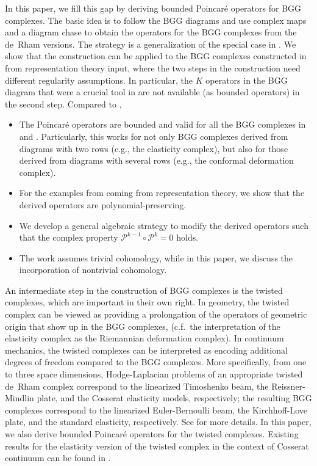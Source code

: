 \documentclass[11pt]{amsart}
\newcommand{\0}{\mathaccent23}
\begin{document}
In this paper, we fill this gap by deriving bounded Poincar\'e operators for BGG complexes. The basic idea is to follow the BGG diagrams and use complex maps and a diagram chase to obtain the operators for the BGG complexes from the de~Rham versions. The strategy is a generalization of the special case in  \cite{christiansen2020poincare}. We show that the construction can be applied to the BGG complexes constructed in \cite{vcap2022bgg} from representation theory input, where the two steps in the construction need different regularity assumptions. In particular, the $K$ operators in the BGG diagram that were a crucial tool in \cite{christiansen2020poincare} are not available (as bounded operators) in the second step. Compared to  \cite{christiansen2020poincare},
\begin{itemize}
\item The Poincar\'e operators are bounded and valid for all the BGG complexes in \cite{arnold2021complexes} and \cite{vcap2022bgg}. Particularly, this works for not only BGG complexes derived from diagrams with two rows (e.g., the elasticity complex), but also for those derived from diagrams with several rows (e.g., the conformal deformation complex).
\item For the examples from \cite{vcap2022bgg} coming from representation theory, we show that the derived operators are polynomial-preserving. 
\item We develop a general algebraic strategy to modify the derived operators such that the complex property $\mathscr{P}^{k-1}\circ \mathscr{P}^{k}=0$ holds.
\item The work \cite{christiansen2020poincare} assumes trivial cohomology, while in this paper, we discuss the incorporation of nontrivial cohomology.
\end{itemize}

An intermediate step in the construction of BGG complexes is the twisted complexes, which are important in their own right. In geometry, the twisted complex can be viewed as providing a prolongation of the operators of geometric origin that show up in the BGG complexes, (c.f.\ the interpretation of the elasticity complex as the Riemannian deformation complex). In continuum mechanics, the twisted complexes can be interpreted as encoding additional degrees of freedom compared to the BGG complexes.  More specifically, from one to three space dimensions, Hodge-Laplacian problems of an appropriate twisted de~Rham complex correspond to the linearized Timoshenko beam, the Reissner-Mindlin plate, and the Cosserat elasticity models, respectively; the resulting BGG complexes correspond to the linearized Euler-Bernoulli beam, the Kirchhoff-Love plate, and the standard elasticity, respectively. See \cite[Section 5]{vcap2022bgg} for more details. In this paper, we also derive bounded Poincar\'e operators for the twisted complexes. Existing results for the elasticity version of the twisted complex in the context of Cosserat continuum can be found in \cite{gunther1958statik}.
\end{document}
